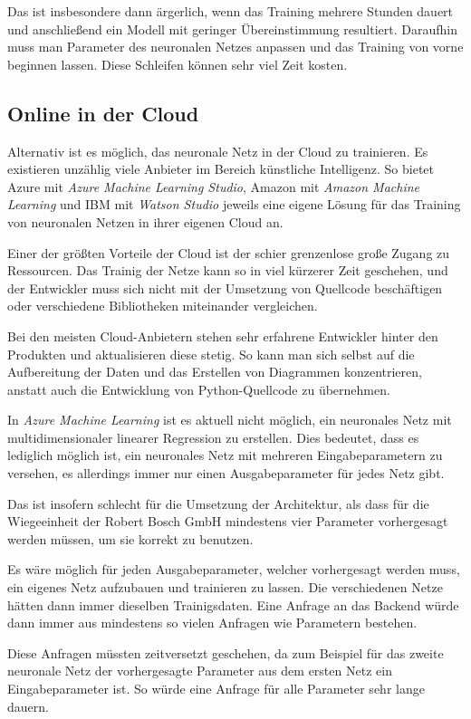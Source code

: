 Das ist insbesondere dann ärgerlich, wenn das Training mehrere Stunden dauert und anschließend ein Modell mit geringer
Übereinstimmung resultiert. Daraufhin muss man Parameter des neuronalen Netzes anpassen und das Training von vorne
beginnen lassen. Diese Schleifen können sehr viel Zeit kosten.

\subsection{Online in der Cloud}
Alternativ ist es möglich, das neuronale Netz in der Cloud zu trainieren. Es existieren unzählig viele Anbieter im
Bereich künstliche Intelligenz. So bietet Azure mit \textit{Azure Machine Learning Studio}, Amazon mit
\textit{Amazon Machine Learning} und IBM mit \textit{Watson Studio} jeweils eine eigene Lösung für das Training von
neuronalen Netzen in ihrer eigenen Cloud an.

Einer der größten Vorteile der Cloud ist der schier grenzenlose große Zugang zu Ressourcen. Das Trainig der Netze kann
so in viel kürzerer Zeit geschehen, und der Entwickler muss sich nicht mit der Umsetzung von Quellcode beschäftigen oder
verschiedene Bibliotheken miteinander vergleichen.

Bei den meisten Cloud-Anbietern stehen sehr erfahrene Entwickler hinter den Produkten und aktualisieren diese stetig. So
kann man sich selbst auf die Aufbereitung der Daten und das Erstellen von Diagrammen konzentrieren, anstatt auch die
Entwicklung von Python-Quellcode zu übernehmen.

In \textit{Azure Machine Learning} ist es aktuell nicht möglich, ein neuronales Netz mit multidimensionaler linearer
Regression zu erstellen. Dies bedeutet, dass es lediglich möglich ist, ein neuronales Netz mit mehreren
Eingabeparametern zu versehen, es allerdings immer nur einen Ausgabeparameter für jedes Netz gibt.

Das ist insofern schlecht für die Umsetzung der Architektur, als dass für die Wiegeeinheit der Robert Bosch GmbH
mindestens vier Parameter vorhergesagt werden müssen, um sie korrekt zu benutzen.

Es wäre möglich für jeden Ausgabeparameter, welcher vorhergesagt werden muss, ein eigenes Netz aufzubauen und trainieren
zu lassen. Die verschiedenen Netze hätten dann immer dieselben Trainigsdaten. Eine Anfrage an das Backend würde dann
immer aus mindestens so vielen Anfragen wie Parametern bestehen.

Diese Anfragen müssten zeitversetzt geschehen, da zum Beispiel für das zweite neuronale Netz der vorhergesagte Parameter
aus dem ersten Netz ein Eingabeparameter ist. So würde eine Anfrage für alle Parameter sehr lange dauern.

